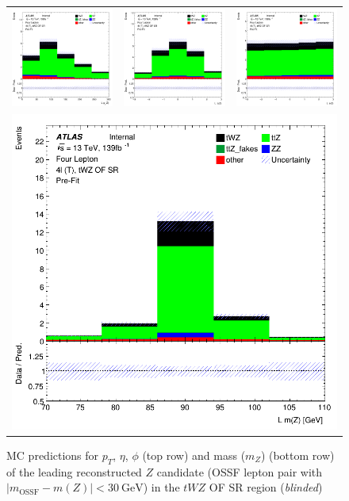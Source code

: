 \clearpage
\begin{figure}[htbp]
\centering
  \begin{tabular}{ccc}

    \includegraphics[width=.2\textwidth]{figures/PreFitPlots/lep4_tWZ_4T_OF_0_Z_pt}&
    \includegraphics[width=.2\textwidth]{figures/PreFitPlots/lep4_tWZ_4T_OF_0_Z_eta} &
    \includegraphics[width=.2\textwidth]{figures/PreFitPlots/lep4_tWZ_4T_OF_0_Z_phi} \\
    \multicolumn{3}{c}{\includegraphics[width=.2\textwidth]{figures/PreFitPlots/lep4_tWZ_4T_OF_0_Z_mass}}

  \end{tabular}
    \caption{MC predictions for $p_{T}$, $\eta$, $\phi$ (top row) and mass ($m_Z$) (bottom row) of the leading reconstructed $Z$ candidate (OSSF lepton pair with $|m_{\text{OSSF}} - m(Z)| <  \SI{30}{\GeV}$) in the $tWZ$ OF SR region (\textit{blinded})}
  \label{fig:4lep-OF-SR-ZCands-Plots}
\end{figure}




